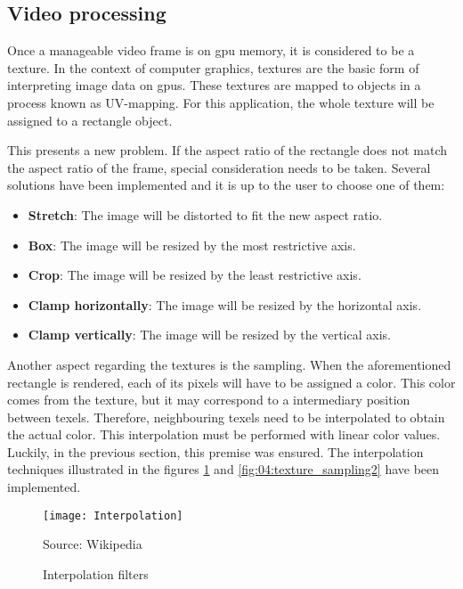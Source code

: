 \documentclass[../main.tex]{subfiles}
\begin{document}
\subsection{Video processing}
Once a manageable video frame is on \gls{gpu} memory, it is considered to be a texture. In the context of computer graphics, textures are the basic form of interpreting image data on \glspl{gpu}. These textures are mapped to objects in a process known as UV-mapping. For this application, the whole texture will be assigned to a rectangle object.\newline

This presents a new problem. If the aspect ratio of the rectangle does not match the aspect ratio of the frame, special consideration needs to be taken. Several solutions have been implemented and it is up to the user to choose one of them:

\begin{itemize}
    \item \textbf{Stretch}: The image will be distorted to fit the new aspect ratio.
    \item \textbf{Box}: The image will be resized by the most restrictive axis. 
    \item \textbf{Crop}: The image will be resized by the least restrictive axis.
    \item \textbf{Clamp horizontally}: The image will be resized by the horizontal axis. 
    \item \textbf{Clamp vertically}: The image will be resized by the vertical axis.
\end{itemize}

Another aspect regarding the textures is the sampling. When the aforementioned rectangle is rendered, each of its \glspl{pixel} will have to be assigned a color. This color comes from the texture, but it may correspond to a intermediary position between \glspl{texel}. Therefore, neighbouring \glspl{texel} need to be interpolated to obtain the actual color. This interpolation must be performed with linear color values. Luckily, in the previous section, this premise was ensured. The interpolation techniques illustrated in the figures \ref{fig:04:texture_sampling1} and \ref{fig:04:texture_sampling2} have been implemented.\newline

\begin{figure}[htbp]
    \centering
    \texttt{[image: Interpolation]}
    
    Source: Wikipedia
    \caption{Interpolation filters}
    \label{fig:04:texture_sampling1}
\end{figure}
\end{document}
